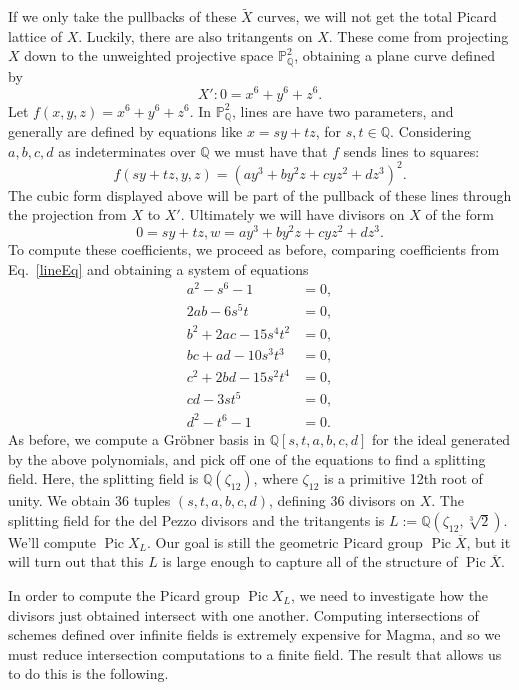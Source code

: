 \documentclass[12pt,twoside]{reedthesis}
\theoremstyle{plain}
\theoremstyle{definition}
\theoremstyle{remark}
\newcommand{\QQ}{\mathbb{Q}}
\newcommand{\Proj}{\mathbb{P}}
\newcommand{\Pic}{\operatorname{Pic}}
\begin{document}
If we only take the pullbacks of these $\widetilde{X}$ curves, we will not get the total Picard lattice of $X$. Luckily, there are also tritangents on $X$. These come from projecting $X$ down to the unweighted projective space $\Proj^2_\QQ$, obtaining a plane curve defined by
\[
X': 0=x^6+y^6+z^6.
\]
Let $f(x,y,z)=x^6+y^6+z^6$. In $\Proj^2_\QQ$, lines are have two parameters, and generally are defined by equations like $x=sy+tz$, for $s,t\in\QQ$. Considering $a,b,c,d$ as indeterminates over $\QQ$ we must have that $f$ sends lines to squares:
\begin{equation}
f(sy+tz,y,z)=(ay^3+by^2z+cyz^2+dz^3)^2.\label{lineEq}
\end{equation}
The cubic form displayed above will be part of the pullback of these lines through the projection from $X$ to $X'$. Ultimately we will have divisors on $X$ of the form 
\[
0=sy+tz, w=ay^3+by^2z+cyz^2+dz^3.
\]To compute these coefficients, we proceed as before, comparing coefficients from Eq.~\ref{lineEq} and obtaining a system of equations
\begin{align*}
a^2-s^6-1&=0,\\
2ab-6s^5t&=0,\\
b^2+2ac-15s^4t^2&=0,\\
bc+ad-10s^3t^3&=0,\\
c^2+2bd-15s^2t^4&=0,\\
cd-3st^5&=0,\\
d^2-t^6-1&=0.
\end{align*}
As before, we compute a Gr\"obner basis in $\QQ[s,t,a,b,c,d]$ for the ideal generated by the above polynomials, and pick off one of the equations to find a splitting field. Here, the splitting field is $\QQ(\zeta_{12})$, where $\zeta_{12}$ is a primitive 12th root of unity. We obtain 36 tuples $(s,t,a,b,c,d)$, defining 36 divisors on $X$. The splitting field for the del Pezzo divisors and the tritangents is $L:=\QQ(\zeta_{12}, \sqrt[3]{2})$. We'll compute $\Pic X_L$. Our goal is still the geometric Picard group $\Pic\overline{X}$, but it will turn out that this $L$ is large enough to capture all of the structure of $\Pic\overline{X}$.

In order to compute the Picard group $\Pic X_L$, we need to investigate how the divisors just obtained intersect with one another. Computing intersections of schemes defined over infinite fields is extremely expensive for Magma, and so we must reduce intersection computations to a finite field. The result that allows us to do this is the following.
\end{document}

